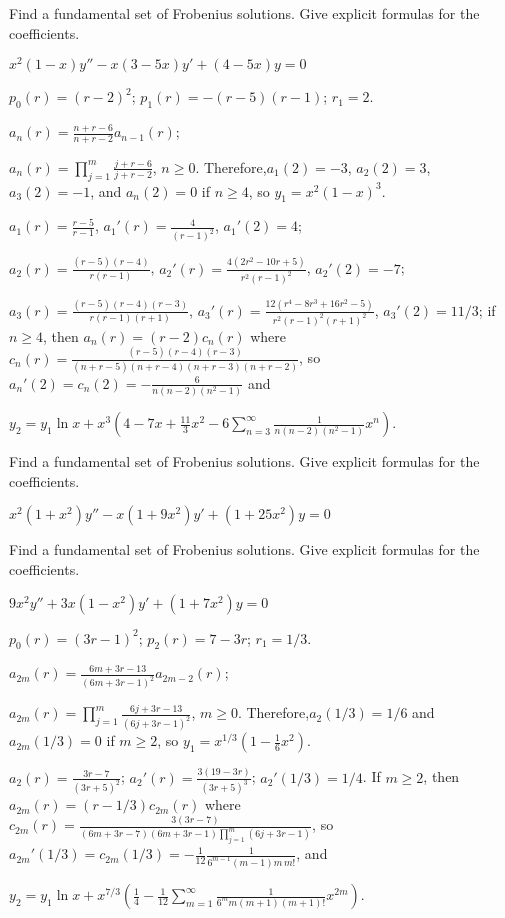 \documentclass{ximera}
\begin{document}
\begin{problem}\label{exer:7.6.48}
Find a
fundamental set of Frobenius solutions. Give explicit formulas for the
coefficients.

$x^2(1-x)y''-x(3-5x)y'+(4-5x)y=0$

\begin{solution}
    $p_0(r)=(r-2)^2$;
$p_1(r)=-(r-5)(r-1)$;
$r_1=2$.


$a_n(r)=\frac{n+r-6}{ n+r-2}
a_{n-1}(r)$;

 $a_n(r)=\prod_{j=1}^m\frac{j+r-6}{ j+r-2}$,
$n\geq 0$. Therefore,$a_1(2)=-3$, $a_2(2)=3$, $a_3(2)=-1$, and
$a_n(2)=0$ if $n\geq 4$, so $y_1=x^2(1-x)^3$.


$a_1(r)=\frac{r-5}{ r-1}$, $a_1'(r)=\frac{4}{(r-1)^2}$,
$a_1'(2)=4$;

$a_2(r)=\frac{(r-5)(r-4)}{ r(r-1)}$,
$a_2'(r)=\frac{4(2r^2-10r+5)}{ r^2(r-1)^2}$,
$a_2'(2)=-7$;

$a_3(r)=\frac{(r-5)(r-4)(r-3)}{ r(r-1)(r+1)}$,
$a_3'(r)=\frac{12(r^4-8r^3+16r^2-5)}{ r^2(r-1)^2(r+1)^2}$,
$a_3'(2)=11/3$; if $n\geq 4$, then
$a_n(r)=(r-2)c_n(r)$ where
$c_n(r)=\frac
{(r-5)(r-4)(r-3)}{(n+r-5)(n+r-4)(n+r-3)(n+r-2)}$, so
$a_n'(2)=c_n(2)=-\frac{6}{ n(n-2)(n^2-1)}$ and

$y_2=y_1\ln
x+x^3\left(4-7x+\frac{11}{3}x^2-6\sum_{n=3}^\infty\frac{1}{
n(n-2)(n^2-1)}x^n\right)$.

\end{solution}
\end{problem}

\begin{problem}\label{exer:7.6.49}
Find a
fundamental set of Frobenius solutions. Give explicit formulas for the
coefficients.

$x^2(1+x^2)y''-x(1+9x^2)y'+(1+25x^2)y=0$
\end{problem}

\begin{problem}\label{exer:7.6.50}
Find a
fundamental set of Frobenius solutions. Give explicit formulas for the
coefficients.

$9x^2y''+3x(1-x^2)y'+(1+7x^2)y=0$

\begin{solution}
    $p_0(r)=(3r-1)^2$;
$p_2(r)=7-3r$;
$r_1=1/3$.

$a_{2m}(r)=\frac{6m+3r-13}{(6m+3r-1)^2}
a_{2m-2}(r)$;

 $a_{2m}(r)=\prod_{j=1}^m\frac{6j+3r-13}{(6j+3r-1)^2}$,
$m\geq 0$. Therefore,$a_2(1/3)=1/6$ and $a_{2m}(1/3)=0$ if $m\geq 2$,
so $y_1=x^{1/3}\left(1-\frac{1}{6}x^2\right)$.


$a_2(r)=\frac{3r-7}{(3r+5)^2}$;
$a_2'(r)=\frac{3(19-3r)}{(3r+5)^3}$; $a_2'(1/3)= 1/4$.
If $m\geq 2$, then $a_{2m}(r)=(r-1/3)c_{2m}(r)$ where
$c_{2m}(r)=\frac{3(3r-7)}{(6m+3r-7)(6m+3r-1)\prod_{j=1}^m(6j+3r-1)}$,
so
$a_{2m}'(1/3)=c_{2m}(1/3)=-\frac{1}{12}\frac{1}{6^{m-1}(m-1)m\,m!}$,
and

 $y_2=y_1\ln x
+x^{7/3}\left(\frac{1}{4}-\frac{1}{12}\sum_{m=1}^\infty
\frac{1}{6^mm(m+1)(m+1)!}x^{2m}\right)$.
\end{solution}
\end{problem}
\end{document}
